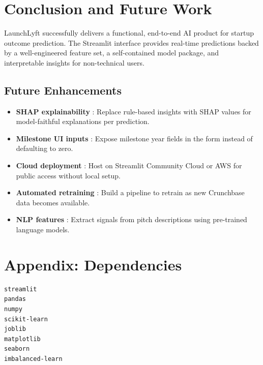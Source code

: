 \documentclass[12pt,a4paper]{article}
\begin{document}
\section{Conclusion and Future Work}

LaunchLyft successfully delivers a functional, end-to-end AI product for startup
outcome prediction. The Streamlit interface provides real-time predictions backed
by a well-engineered feature set, a self-contained model package, and interpretable
insights for non-technical users.

\subsection{Future Enhancements}
\begin{itemize}[leftmargin=1.5em]
    \item \textbf{SHAP explainability} : Replace rule-based insights with SHAP
          values for model-faithful explanations per prediction.
    \item \textbf{Milestone UI inputs} : Expose milestone year fields in the form
          instead of defaulting to zero.
    \item \textbf{Cloud deployment} : Host on Streamlit Community Cloud or AWS
          for public access without local setup.
    \item \textbf{Automated retraining} : Build a pipeline to retrain as new
          Crunchbase data becomes available.
    \item \textbf{NLP features} : Extract signals from pitch descriptions using
          pre-trained language models.
\end{itemize}

\section*{Appendix: Dependencies}

\begin{lstlisting}[caption={\texttt{requirements.txt}}]
streamlit
pandas
numpy
scikit-learn
joblib
matplotlib
seaborn
imbalanced-learn
\end{lstlisting}

\end{document}
